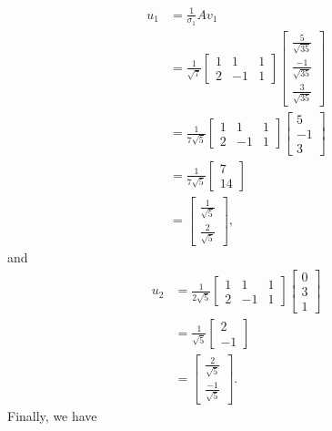 \documentclass[10pt,a4paper]{article}
\theoremstyle{definition}
\begin{document}
\begin{align*}
u_1 &= \frac{1}{\sigma_1} A v_1\\
&= \frac{1}{\sqrt{7}} \begin{bmatrix}
1 & 1 & 1\\
2 & -1 & 1
\end{bmatrix} \begin{bmatrix}
\frac{5}{\sqrt{35}}\\
\frac{-1}{\sqrt{35}}\\
\frac{3}{\sqrt{35}}
\end{bmatrix}\\
&= \frac{1}{7 \sqrt{5}} \begin{bmatrix}
1 & 1 & 1\\
2 & -1 & 1
\end{bmatrix} \begin{bmatrix}
5\\
-1\\
3
\end{bmatrix}\\
&= \frac{1}{7 \sqrt{5}} \begin{bmatrix}
7\\
14
\end{bmatrix}\\
&= \begin{bmatrix}
\frac{1}{\sqrt{5}}\\
\frac{2}{\sqrt{5}}
\end{bmatrix},
\end{align*}
and 
\begin{align*}
u_2 &= \frac{1}{2\sqrt{5}} \begin{bmatrix}
1 & 1 & 1\\
2 & -1 & 1
\end{bmatrix} \begin{bmatrix}
0\\
3\\
1
\end{bmatrix}\\
&= \frac{1}{\sqrt{5}} \begin{bmatrix}
2\\
-1
\end{bmatrix}\\
&= \begin{bmatrix}
\frac{2}{\sqrt{5}}\\
\frac{-1}{\sqrt{5}}
\end{bmatrix}.
\end{align*}
Finally, we have
\end{document}
